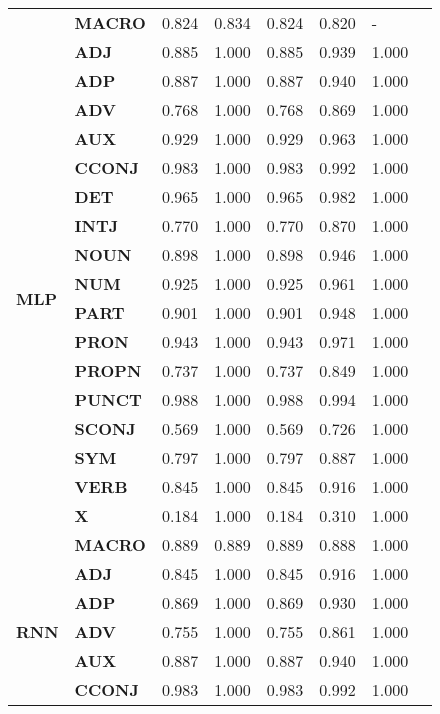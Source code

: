 \begin{longtable}{|l||l||l||l||l||l||l||l|}
\textbf{} & \textbf{MACRO} & 0.824 & 0.834 & 0.824 & 0.820 & - \\
\cline{1-7}
\multirow[t]{18}{*}{\textbf{MLP}} & \textbf{ADJ} & 0.885 & 1.000 & 0.885 & 0.939 & 1.000 \\
\textbf{} & \textbf{ADP} & 0.887 & 1.000 & 0.887 & 0.940 & 1.000 \\
\textbf{} & \textbf{ADV} & 0.768 & 1.000 & 0.768 & 0.869 & 1.000 \\
\textbf{} & \textbf{AUX} & 0.929 & 1.000 & 0.929 & 0.963 & 1.000 \\
\textbf{} & \textbf{CCONJ} & 0.983 & 1.000 & 0.983 & 0.992 & 1.000 \\
\textbf{} & \textbf{DET} & 0.965 & 1.000 & 0.965 & 0.982 & 1.000 \\
\textbf{} & \textbf{INTJ} & 0.770 & 1.000 & 0.770 & 0.870 & 1.000 \\
\textbf{} & \textbf{NOUN} & 0.898 & 1.000 & 0.898 & 0.946 & 1.000 \\
\textbf{} & \textbf{NUM} & 0.925 & 1.000 & 0.925 & 0.961 & 1.000 \\
\textbf{} & \textbf{PART} & 0.901 & 1.000 & 0.901 & 0.948 & 1.000 \\
\textbf{} & \textbf{PRON} & 0.943 & 1.000 & 0.943 & 0.971 & 1.000 \\
\textbf{} & \textbf{PROPN} & 0.737 & 1.000 & 0.737 & 0.849 & 1.000 \\
\textbf{} & \textbf{PUNCT} & 0.988 & 1.000 & 0.988 & 0.994 & 1.000 \\
\textbf{} & \textbf{SCONJ} & 0.569 & 1.000 & 0.569 & 0.726 & 1.000 \\
\textbf{} & \textbf{SYM} & 0.797 & 1.000 & 0.797 & 0.887 & 1.000 \\
\textbf{} & \textbf{VERB} & 0.845 & 1.000 & 0.845 & 0.916 & 1.000 \\
\textbf{} & \textbf{X} & 0.184 & 1.000 & 0.184 & 0.310 & 1.000 \\
\textbf{} & \textbf{MACRO} & 0.889 & 0.889 & 0.889 & 0.888 & 1.000 \\
\cline{1-7}
\multirow[t]{18}{*}{\textbf{RNN}} & \textbf{ADJ} & 0.845 & 1.000 & 0.845 & 0.916 & 1.000 \\
\textbf{} & \textbf{ADP} & 0.869 & 1.000 & 0.869 & 0.930 & 1.000 \\
\textbf{} & \textbf{ADV} & 0.755 & 1.000 & 0.755 & 0.861 & 1.000 \\
\textbf{} & \textbf{AUX} & 0.887 & 1.000 & 0.887 & 0.940 & 1.000 \\
\textbf{} & \textbf{CCONJ} & 0.983 & 1.000 & 0.983 & 0.992 & 1.000 \\

\end{longtable}
